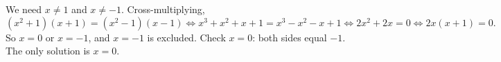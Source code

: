 We need $x\ne1$ and $x\ne-1$. Cross-multiplying,
\[
(x^2+1)(x+1)=(x^2-1)(x-1)\iff x^3+x^2+x+1=x^3-x^2-x+1\iff2x^2+2x=0\iff2x(x+1)=0 .
\]
So $x=0$ or $x=-1$, and $x=-1$ is excluded. Check $x=0$: both sides equal $-1$. The only solution is $x=\boxed{0}$.
